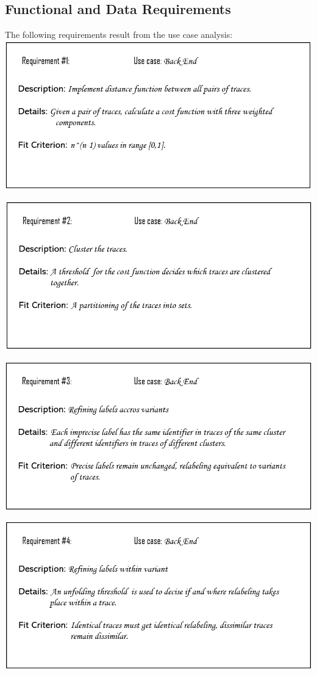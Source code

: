 \documentclass[notitlepage]{article}
\begin{document}
\begin{flushleft}
\subsection{Functional and Data Requirements}
The following requirements result from the use case analysis:\\
\medskip
\includegraphics[scale=0.6]{Req1.png}

\includegraphics[scale=0.6]{Req2.png}

\includegraphics[scale=0.6]{Req3.png}

\includegraphics[scale=0.6]{Req4.png}


\end{flushleft}
\end{document}
